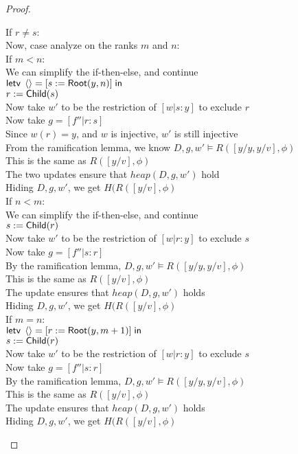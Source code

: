 \begin{proof}
\begin{tabbedproof}
\ooo If $r \not= s$: \\
\oooo Now, case analyze on the ranks $m$ and $n$: \\
\oooo If $m < n$: \\
\ooooo We can simplify the if-then-else, and continue \\
\ooooo $\mathsf{letv}\;\left<\right> = [s := \mathsf{Root}(y, n)]\;\mathsf{in}\;$ \\
\ooooo $r := \mathsf{Child}(s)$ \\
\ooooo Now take $w'$ to be the restriction of $[w|s:y]$ to exclude $r$ \\
\ooooo Now take $g = [f''|r:s]$ \\
\ooooo Since $w(r) = y$, and $w$ is injective, $w'$ is still injective \\
\ooooo From the ramification lemma, we know $D, g, w' \models R([y/y, y/v], \phi)$ \\
\ooooo This is the same as $R([y/v], \phi)$ \\
\ooooo The two updates ensure that $\mathit{heap}(D, g, w')$ hold \\
\ooooo Hiding $D, g, w'$, we get $H(R([y/v], \phi)$ \\
\oooo If $n < m$: \\
\ooooo We can simplify the if-then-else, and continue \\
\ooooo $s := \mathsf{Child}(r)$ \\
\ooooo Now take $w'$ to be the restriction of $[w|r:y]$ to exclude $s$ \\
\ooooo Now take $g = [f''|s:r]$ \\
\ooooo By the ramification lemma, $D, g, w' \models R([y/y, y/v], \phi)$ \\
\ooooo This is the same as $R([y/v], \phi)$ \\
\ooooo The update ensures that $\mathit{heap}(D, g, w')$ holds \\
\ooooo Hiding $D, g, w'$, we get $H(R([y/v], \phi)$ \\
\oooo If $m = n$: \\
\ooooo $\mathsf{letv}\;\left<\right> = [r := \mathsf{Root}(y, m+1)]\;\mathsf{in}\;$ \\
\ooooo $s := \mathsf{Child}(r)$ \\
\ooooo Now take $w'$ to be the restriction of $[w|r:y]$ to exclude $s$ \\
\ooooo Now take $g = [f''|s:r]$ \\
\ooooo By the ramification lemma, $D, g, w' \models R([y/y, y/v], \phi)$ \\
\ooooo This is the same as $R([y/v], \phi)$ \\
\ooooo The update ensures that $\mathit{heap}(D, g, w')$ holds \\
\ooooo Hiding $D, g, w'$, we get $H(R([y/v], \phi)$ \\

\end{tabbedproof}
\end{proof}

